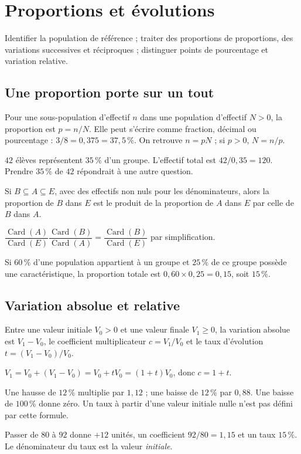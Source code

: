 \documentclass[../cours_2de.tex]{subfiles}
\begin{document}
\setcounter{chapter}{16}
\chapter{Proportions et évolutions}
\label{sec:ch17}
\begin{objectif}
Identifier la population de référence ; traiter des proportions de proportions, des variations successives et réciproques ; distinguer points de pourcentage et variation relative.
\end{objectif}
\section{Une proportion porte sur un tout}
Pour une sous-population d'effectif $n$ dans une population d'effectif $N>0$, la proportion est $p=n/N$.
Elle peut s'écrire comme fraction, décimal ou pourcentage : $3/8=0{,}375=37{,}5\,\%$.
On retrouve $n=pN$ ; si $p>0$, $N=n/p$.
\begin{exemple}
$42$ élèves représentent $35\,\%$ d'un groupe. L'effectif total est $42/0{,}35=120$.
Prendre $35\,\%$ de $42$ répondrait à une autre question.
\end{exemple}
\begin{propriete}
Si $B\subseteq A\subseteq E$, avec des effectifs non nuls pour les dénominateurs, alors
la proportion de $B$ dans $E$ est le produit de la proportion de $A$ dans $E$ par celle de $B$ dans $A$.
\end{propriete}
\begin{demonstration}
$\dfrac{\operatorname{Card}(A)}{\operatorname{Card}(E)}
 \dfrac{\operatorname{Card}(B)}{\operatorname{Card}(A)}
=\dfrac{\operatorname{Card}(B)}{\operatorname{Card}(E)}$ par simplification.
\end{demonstration}
Si $60\,\%$ d'une population appartient à un groupe et $25\,\%$ de ce groupe possède une caractéristique, la proportion totale est $0{,}60\times0{,}25=0{,}15$, soit $15\,\%$.
\section{Variation absolue et relative}
Entre une valeur initiale $V_0>0$ et une valeur finale $V_1\geq0$, la variation absolue est $V_1-V_0$, le coefficient multiplicateur $c=V_1/V_0$ et le taux d'évolution
$t=(V_1-V_0)/V_0$.
\begin{demonstration}
$V_1=V_0+(V_1-V_0)=V_0+tV_0=(1+t)V_0$, donc $c=1+t$.
\end{demonstration}
Une hausse de $12\,\%$ multiplie par $1{,}12$ ; une baisse de $12\,\%$ par $0{,}88$.
Une baisse de $100\,\%$ donne zéro. Un taux à partir d'une valeur initiale nulle n'est pas défini par cette formule.
\begin{exemple}
Passer de $80$ à $92$ donne $+12$ unités, un coefficient $92/80=1{,}15$ et un taux $15\,\%$.
Le dénominateur du taux est la valeur \emph{initiale}.
\end{exemple}
\end{document}

